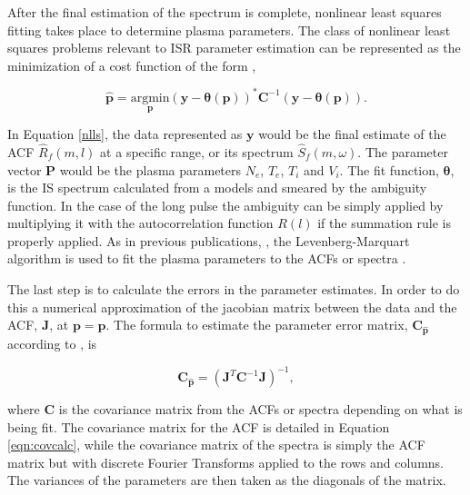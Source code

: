\documentclass[draft,ras]{agutex}
\newcommand{\pcom}[2]{\marginpar{{\footnotesize \bf #1}}{\it {#2}}}
\begin{document}
\begin{article}
After the final estimation of the spectrum is complete, nonlinear least squares fitting takes place to determine plasma parameters.  
The class of nonlinear least squares problems relevant to ISR parameter estimation can be represented as the minimization of a cost function of the form \citep{kayvol1},

\begin{equation}
	\mathbf{\hat{p}}= \underset{\mathbf{p}}{\text{argmin}} (\mathbf{y}-\bm{\theta}(\mathbf{p}))^*\mathbf{C}^{-1}(\mathbf{y}-\bm{\theta}(\mathbf{p})).
\label{nlls}
\end{equation}

In Equation \ref{nlls}, the data represented as $\mathbf{y}$ would be the final estimate of the ACF $\widehat{R}_f(m,l)$ at a specific range, or its spectrum $\widehat{S}_f(m,\omega)$. The parameter vector $\mathbf{P}$ would be the plasma parameters $N_e$, $T_e$, $T_i$ and $V_i$. The fit function, $\bm{\theta}$, is the IS spectrum calculated from a models \citep[e.g.,][]{kudeki:milla:1} and smeared by the ambiguity function. In the case of the long pulse the ambiguity can be simply applied by multiplying it with the autocorrelation function $R(l)$ if the summation rule is properly applied. As in previous publications, \citep[e.g.,][]{nikoukar2008}, the Levenberg-Marquart algorithm is used to fit the plasma parameters to the ACFs or spectra \citep{levenberg1944,marquardt:1963}.

The last step is to calculate the errors in the parameter estimates. In order to do this a numerical approximation of the jacobian matrix between the data and the ACF, $\mathbf{J}$, at $\mathbf{p}=\mathbf{\hat{p}}$. The formula to estimate the parameter error matrix, $\mathbf{C}_{\mathbf{\hat{p}}}$ according to \citet{Hysell:2000cq}, is


\begin{equation}
\label{eqn:jacinv}
\mathbf{C}_{\mathbf{\hat{p}}}=(\mathbf{J}^T \mathbf{C}^{-1}\mathbf{J})^{-1},
\end{equation}

\noindent where $ \mathbf{C}$ is the covariance matrix from the ACFs or spectra depending on what is being fit. The covariance matrix for the ACF is detailed in Equation \ref{eqn:covcalc}, while the covariance matrix of the spectra is simply the ACF matrix but with discrete Fourier Transforms applied to the rows and columns. The variances of the parameters are then taken as the diagonals of the matrix.



\end{article}
\end{document}
